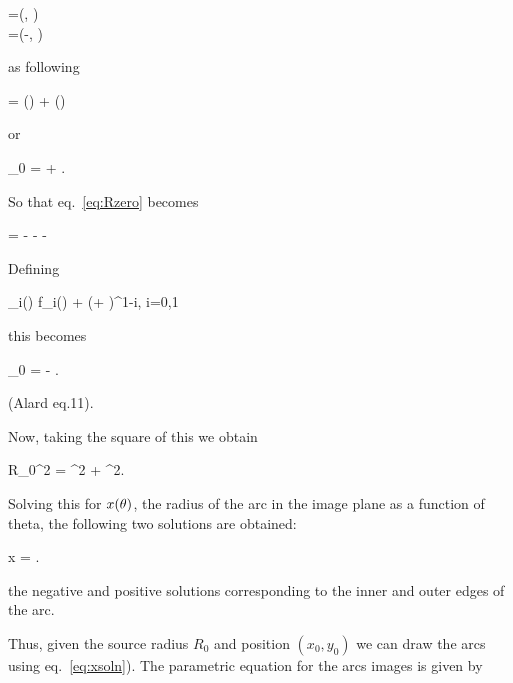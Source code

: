 \bea
\label{eq:unitvs}
=(\cos\te, \sin \te) \\
\hat{\theta}=(-\sin \te, \cos \te)
\eea

 as following

\beq
\vecrz = (\vecrz \cdot \hatth) \hatth + (\vecrz \cdot \hatr) \hatr
\eeq

or


\beq
\label{eq:rzero}
_{0} = \left[ \yone \,  \cos \te + \ytwo \,  \sin \te \right]  + \left[ -\yone \,  \sin \te + \ytwo \,  \cos \te \right] \hat{\theta}.  \;\;\;
\eeq

So that eq.~\eqref{eq:Rzero} becomes

\beq
{} =  -   \hat{\theta} -  \left[ \yone \,  \cos \te + \ytwo \,  \sin \te \right]  - \left[ -\yone \,  \sin \te + \ytwo \,  \cos \te \right] \hat{\theta} \;\;\;
\eeq


Defining

\beq
{}_i(\theta) \equiv f_i(\theta) + (\yone \cos \te + \ytwo \sin \te)\re^{1-i}, \;\; i=0,1
\eeq

this becomes

\beq
{}_{0} =  -   \hat{\theta}. \;\;\; \label{eq:Alard11}
\eeq

(Alard eq.11).

Now, taking the square of this we obtain

\beq
R_{0}^2 = ^2 + ^2. \;\;\;
\eeq

Solving this for $x(\theta)$, the radius of the arc in the image plane as
a function of theta, the following two solutions are obtained:

\beq
\label{eq:xsoln}
x = . \;\;\;
\eeq

the negative and positive solutions corresponding to the inner and outer edges of the arc.

Thus, given the source radius $R_{0}$ and position $(x_0,y_0)$ we can
draw the arcs using eq.~\eqref{eq:xsoln}). The parametric equation for the
arcs images is given by

